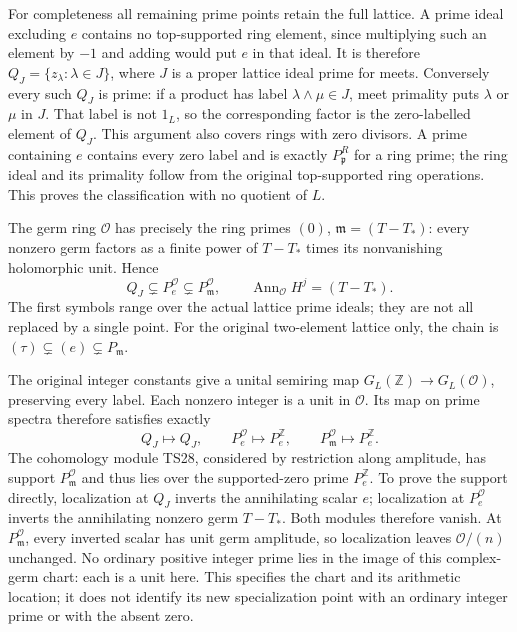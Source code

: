 For completeness all remaining prime points retain the full lattice.
A prime ideal excluding \(e\) contains no top-supported ring element,
since multiplying such an element by \(-1\) and adding would put
\(e\) in that ideal. It is therefore
\(Q_J=\{z_\lambda:\lambda\in J\}\), where \(J\) is a
proper lattice ideal prime for meets. Conversely every such \(Q_J\)
is prime: if a product has label \(\lambda\wedge\mu\in J\),
meet primality puts \(\lambda\) or \(\mu\) in \(J\).
That label is not \(1_L\), so the corresponding factor is the
zero-labelled element of \(Q_J\). This argument also covers rings
with zero divisors. A prime containing \(e\) contains every zero
label and is exactly \(P_{\mathfrak p}^R\) for a ring prime;
the ring ideal and its primality follow from the original top-supported
ring operations. This proves the classification with no quotient of \(L\).

The germ ring \(\mathcal O\) has precisely the ring primes
\((0)\), \(\mathfrak m=(T-T_*)\): every nonzero germ factors
as a finite power of \(T-T_*\) times its nonvanishing holomorphic
unit. Hence
\[
 Q_J\subsetneq P_e^{\mathcal O}\subsetneq
 P_{\mathfrak m}^{\mathcal O},\qquad
 \operatorname{Ann}_{\mathcal O}H^j=(T-T_*).
 \tag{TS31}
\]
The first symbols range over the actual lattice prime ideals; they
are not all replaced by a single point. For the original two-element
lattice only, the chain is \((\tau)\subsetneq(e)\subsetneq
P_{\mathfrak m}\).

The original integer constants give a unital semiring map
\(G_L(\mathbb Z)\to G_L(\mathcal O)\), preserving every label.
Each nonzero integer is a unit in \(\mathcal O\). Its map on prime
spectra therefore satisfies exactly
\[
 Q_J\longmapsto Q_J,\qquad
 P_e^{\mathcal O}\longmapsto P_e^{\mathbb Z},\qquad
 P_{\mathfrak m}^{\mathcal O}\longmapsto P_e^{\mathbb Z}.
 \tag{TS32}
\]
The cohomology module TS28, considered by restriction along amplitude,
has support \(P_{\mathfrak m}^{\mathcal O}\) and thus lies over
the supported-zero prime \(P_e^{\mathbb Z}\). To prove the support
directly, localization at \(Q_J\) inverts the annihilating scalar
\(e\); localization at \(P_e^{\mathcal O}\) inverts the annihilating
nonzero germ \(T-T_*\). Both modules therefore vanish. At
\(P_{\mathfrak m}^{\mathcal O}\), every inverted scalar has unit
germ amplitude, so localization leaves \(\mathcal O/(n)\) unchanged.
No ordinary positive
integer prime lies in the image of this complex-germ chart: each is
a unit here. This specifies the chart and its arithmetic location;
it does not identify its new specialization point with an ordinary
integer prime or with the absent zero.

